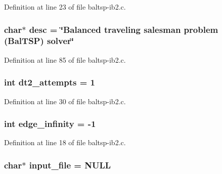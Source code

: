 Definition at line 23 of file baltsp-ib2.c.\hypertarget{bin_2baltsp-ib2_8c_3aad16fd4bea1b9717f232ea75ad6449}{
\subsubsection[{desc}]{\setlength{\rightskip}{0pt plus 5cm}char$\ast$ {\bf desc} = \char`\"{}Balanced traveling salesman problem (BalTSP) solver\char`\"{}}}
\label{bin_2baltsp-ib2_8c_3aad16fd4bea1b9717f232ea75ad6449}




Definition at line 85 of file baltsp-ib2.c.\hypertarget{bin_2baltsp-ib2_8c_d4c3a6197eb631f711a3baf6af37e85c}{
\subsubsection[{dt2\_\-attempts}]{\setlength{\rightskip}{0pt plus 5cm}int {\bf dt2\_\-attempts} = 1}}
\label{bin_2baltsp-ib2_8c_d4c3a6197eb631f711a3baf6af37e85c}




Definition at line 30 of file baltsp-ib2.c.\hypertarget{bin_2baltsp-ib2_8c_61a12d5995172f376610cce2f19e5855}{
\subsubsection[{edge\_\-infinity}]{\setlength{\rightskip}{0pt plus 5cm}int {\bf edge\_\-infinity} = -1}}
\label{bin_2baltsp-ib2_8c_61a12d5995172f376610cce2f19e5855}




Definition at line 18 of file baltsp-ib2.c.\hypertarget{bin_2baltsp-ib2_8c_a4f3a15de34c409bdec6ceacf93078ed}{
\subsubsection[{input\_\-file}]{\setlength{\rightskip}{0pt plus 5cm}char$\ast$ {\bf input\_\-file} = NULL}}
\label{bin_2baltsp-ib2_8c_a4f3a15de34c409bdec6ceacf93078ed}




